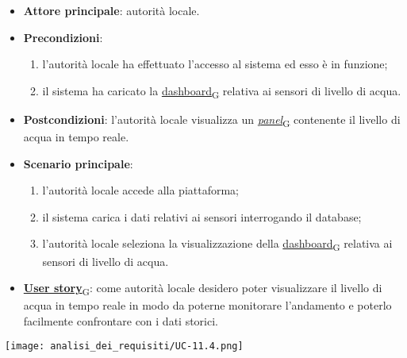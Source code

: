 \newpage

\begin{itemize}
	\item \textbf{Attore principale}: autorità locale.
	\item \textbf{Precondizioni}:
	      \begin{enumerate}
		      \item l'autorità locale ha effettuato l'accesso al sistema ed esso è in funzione;
		      \item il sistema ha caricato la \href{https://7last.github.io/docs/rtb/documentazione-interna/glossario\#dashboard}{dashboard\textsubscript{G}} relativa ai sensori di livello di acqua.
	      \end{enumerate}
	\item \textbf{Postcondizioni}: l'autorità locale visualizza un \href{https://7last.github.io/docs/rtb/documentazione-interna/glossario\#panel}{\textit{panel}\textsubscript{G}} contenente il livello di acqua in tempo reale.
	\item \textbf{Scenario principale}:
	      \begin{enumerate}
		      \item l'autorità locale accede alla piattaforma;
		      \item il sistema carica i dati relativi ai sensori interrogando il database;
		      \item l'autorità locale seleziona la visualizzazione della \href{https://7last.github.io/docs/rtb/documentazione-interna/glossario\#dashboard}{dashboard\textsubscript{G}} relativa ai sensori di livello di acqua.
	      \end{enumerate}
	\item \href{https://7last.github.io/docs/rtb/documentazione-interna/glossario\#user-story}{\textbf{User story}\textsubscript{G}}:
	      come autorità locale desidero poter visualizzare il livello di acqua in tempo reale in modo da poterne monitorare l'andamento
	      e poterlo facilmente confrontare con i dati storici.
\end{itemize}
\begin{center}
	\texttt{[image: analisi\_dei\_requisiti/UC-11.4.png]}
\end{center}

